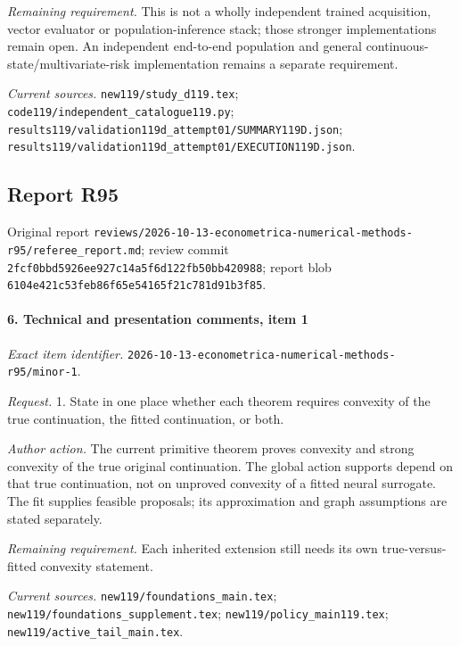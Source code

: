 \par\emph{Remaining requirement.} This is not a wholly independent trained acquisition, vector evaluator or population-inference stack; those stronger implementations remain open. An independent end-to-end population and general continuous-state/\allowbreak{}multivariate-risk implementation remains a separate requirement.

\par\emph{Current sources.} \nolinkurl{new119/study_d119.tex}; \nolinkurl{code119/independent_catalogue119.py}; \nolinkurl{results119/validation119d_attempt01/SUMMARY119D.json}; \nolinkurl{results119/validation119d_attempt01/EXECUTION119D.json}.

\subsection{Report R95}

Original report \nolinkurl{reviews/2026-10-13-econometrica-numerical-methods-r95/referee_report.md}; review commit \nolinkurl{2fcf0bbd5926ee927c14a5f6d122fb50bb420988}; report blob \nolinkurl{6104e421c53feb86f65e54165f21c781d91b3f85}.

\paragraph{6. Technical and presentation comments, item 1}

\emph{Exact item identifier.} \nolinkurl{2026-10-13-econometrica-numerical-methods-r95/minor-1}.

\par\emph{Request.} 1. State in one place whether each theorem requires convexity of the true continuation, the fitted continuation, or both.

\par\emph{Author action.} The current primitive theorem proves convexity and strong convexity of the true original continuation. The global action supports depend on that true continuation, not on unproved convexity of a fitted neural surrogate. The fit supplies feasible proposals; its approximation and graph assumptions are stated separately.

\par\emph{Remaining requirement.} Each inherited extension still needs its own true-versus-fitted convexity statement.

\par\emph{Current sources.} \nolinkurl{new119/foundations_main.tex}; \nolinkurl{new119/foundations_supplement.tex}; \nolinkurl{new119/policy_main119.tex}; \nolinkurl{new119/active_tail_main.tex}.

